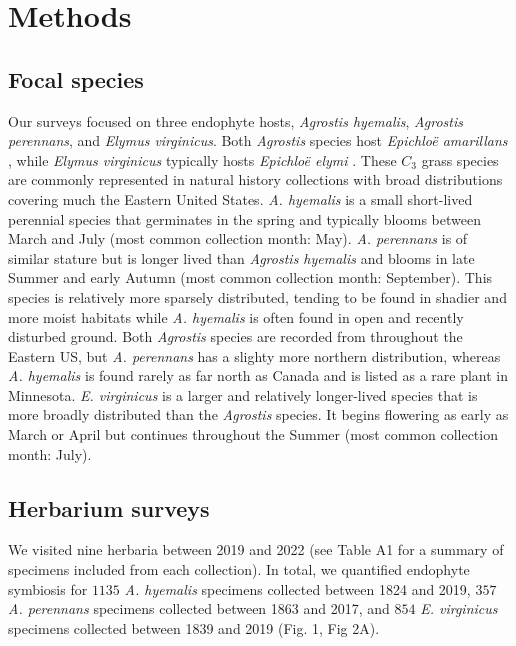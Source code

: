 \documentclass[11pt]{article}
\let\cite\citep
\begin{document}
\section*{Methods}
        \subsection*{Focal species}
Our surveys focused on three endophyte hosts, \emph{Agrostis hyemalis}, \emph{Agrostis perennans}, and \emph{Elymus virginicus}. Both \emph{Agrostis} species host \emph{Epichloë amarillans} \cite{craven2001multigene, leuchtmann2014nomenclatural}, while \emph{Elymus virginicus} typically hosts \emph{Epichloë elymi} \cite{clay2002evolutionary}.
These $C_3$ grass species are commonly represented in natural history collections with broad distributions covering much the Eastern United States.
\emph{A. hyemalis} is a small short-lived perennial species that germinates in the spring and typically blooms between March and July (most common collection month: May).
\emph{A. perennans} is of similar stature but is longer lived than \emph{Agrostis hyemalis} and blooms in late Summer and early Autumn (most common collection month: September). 
This species is relatively more sparsely distributed, tending to be found in shadier and more moist habitats while \emph{A. hyemalis} is often found in open and recently disturbed ground. 
Both \emph{Agrostis} species are recorded from throughout the Eastern US, but \emph{A. perennans} has a slighty more northern distribution, whereas \emph{A. hyemalis} is found rarely as far north as Canada and is listed as a rare plant in Minnesota.
\emph{E. virginicus} is a larger and relatively longer-lived  species that is more broadly distributed than the \emph{Agrostis} species. 
It begins flowering as early as March or April but continues throughout the Summer (most common collection month: July).

		\subsection*{Herbarium surveys}
We visited nine herbaria between 2019 and 2022 (see Table A1 for a summary of specimens included from each collection). 
In total, we quantified endophyte symbiosis for $1135$ \emph{A. hyemalis} specimens collected between 1824 and 2019, $357$ \emph{A. perennans} specimens collected between 1863 and 2017, and $854$ \emph{E. virginicus} specimens collected between 1839 and 2019 (Fig. 1, Fig 2A).
\end{document}
